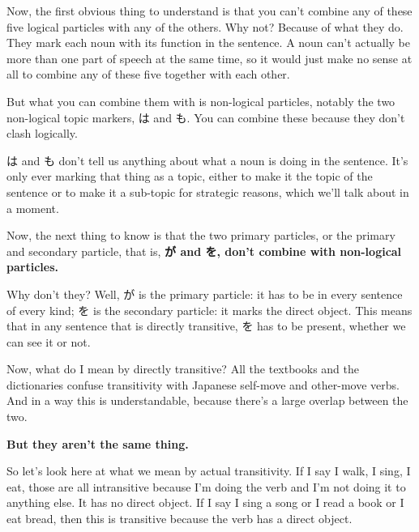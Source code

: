{}

Now, the first obvious thing to understand is that you can't combine any of these five logical particles with any of the others. Why not? Because of what they do. They mark each noun with its function in the sentence. A noun can't actually be more than one part of speech at the same time, so it would just make no sense at all to combine any of these five together with each other.

\thinrule

But what you can combine them with is non-logical particles, notably the two non-logical topic markers, は and も. You can combine these because they don't clash logically.

は and も don't tell us anything about what a noun is doing in the sentence. It's only ever marking that thing as a topic, either to make it the topic of the sentence or to make it a sub-topic for strategic reasons, which we'll talk about in a moment.

\stopsectionlevel

\startsectionlevel[title={Primary & secondary particles},reference={primary-secondary-particles}]

Now, the next thing to know is that the two primary particles, or the primary and secondary particle, that is, {\bf が and を, don't combine with non-logical particles.}

{}

Why don't they? Well, が is the primary particle: it has to be in every sentence of every kind; を is the secondary particle: it marks the direct object. This means that in any sentence that is directly transitive, を has to be present, whether we can see it or not.

\thinrule

Now, what do I mean by directly transitive? All the textbooks and the dictionaries confuse transitivity with Japanese self-move and other-move verbs. And in a way this is understandable, because there's a large overlap between the two.

{\bf But they aren't the same thing.}

So let's look here at what we mean by actual transitivity. If I say I walk, I sing, I eat, those are all intransitive because I'm doing the verb and I'm not doing it to anything else. It has no direct object. If I say I sing a song or I read a book or I eat bread, then this is transitive because the verb has a direct object.

